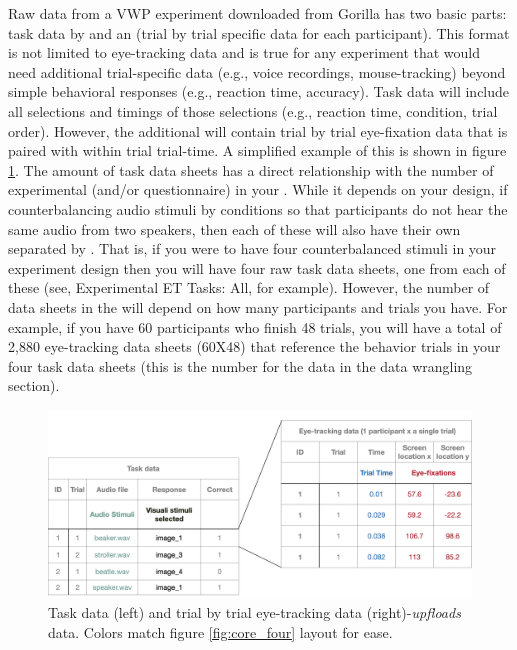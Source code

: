Raw data from a VWP experiment downloaded from Gorilla has two basic parts: task data by  and an  (trial by trial specific data for each participant). This format is not limited to eye-tracking data and is true for any experiment that would need additional trial-specific data (e.g., voice recordings, mouse-tracking) beyond simple behavioral responses (e.g., reaction time, accuracy). Task data will include all selections and timings of those selections (e.g., reaction time, condition, trial order). However, the additional  will contain trial by trial eye-fixation data that is paired with within trial trial-time. A simplified example of this is shown in figure \ref{fig:data_structure}. The amount of task data sheets has a direct relationship with the number of experimental (and/or questionnaire)  in your . While it depends on your design, if counterbalancing audio stimuli by conditions so that participants do not hear the same audio from two speakers, then each of these will also have their own  separated by . That is, if you were to have four counterbalanced stimuli  in your experiment design then you will have four raw task data sheets, one from each of these  (see, Experimental ET Tasks: All, for example). However, the number of data sheets in the  will depend on how many participants and trials you have. For example, if you have 60 participants who finish 48 trials, you will have a total of 2,880 eye-tracking data sheets (60X48) that reference the behavior trials in your four task data sheets (this is the number for the data in the data wrangling section).

\begin{figure}[ht]
    \centering
    \includegraphics[scale=.3]{figures/data_structure.png}
    \caption{Task data (left) and trial by trial eye-tracking data (right)-\textit{upfloads} data. Colors match figure \ref{fig:core_four} layout for ease.}
    \label{fig:data_structure}
\end{figure}

